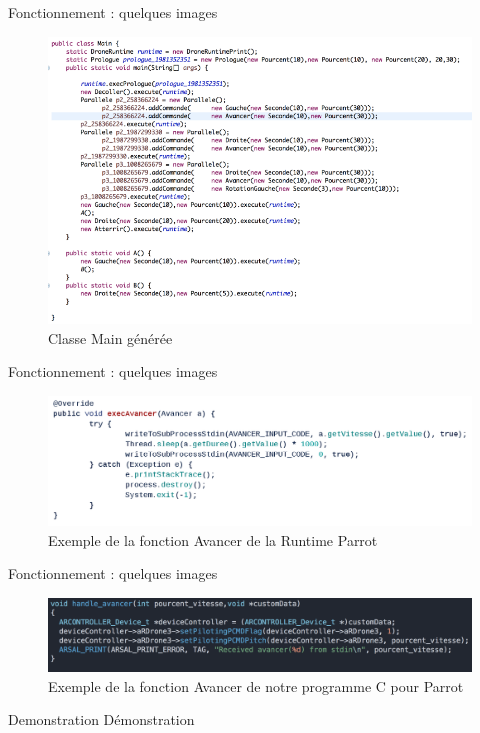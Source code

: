 \documentclass{bredelebeamer}
\begin{document}
\begin{frame}{Fonctionnement : quelques images}
\begin{figure}
\centering
\includegraphics[scale=0.35]{images/ClasseGen.png}
\caption{Classe Main générée}
\end{figure}
\end{frame}

\begin{frame}{Fonctionnement : quelques images}
\begin{figure}
\centering
\includegraphics[scale=0.30]{images/RuntimeAvancer.png}
\caption{Exemple de la fonction Avancer de la Runtime Parrot}
\end{figure}
\end{frame}

\begin{frame}{Fonctionnement : quelques images}
\begin{figure}
\centering
\includegraphics[scale=0.18]{images/Cavancer.png}
\caption{Exemple de la fonction Avancer de notre programme C pour Parrot}
\end{figure}
\end{frame}

\begin{frame}{Demonstration}
\centering
Démonstration
\end{frame}
\end{document}
